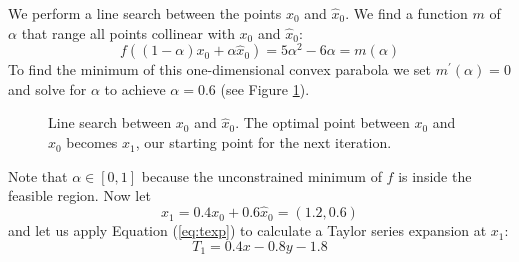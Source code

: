 We perform a line search between the points $x_0$ and $\hat{x}_0$.
We find a function $m$ of $\alpha$ that range all points collinear with $x_0$
and $\hat{x}_0$:
\[
f((1-\alpha) x_0 + \alpha \hat{x}_0) = 5\alpha^2 - 6\alpha = m(\alpha)
\]
To find the minimum of this one-dimensional convex parabola we set
$m^\prime(\alpha) = 0$ and solve for $\alpha$ to achieve $\alpha = 0.6$
(see Figure \ref{fig:steplength}).
\begin{figure}[h!]
    \centering
    
    \caption{Line search between $x_0$ and $\hat{x}_0$. The optimal point
             between $x_0$ and $\hat{x}_0$ becomes $x_1$, our starting point
             for the next iteration.}
    \label{fig:steplength}
\end{figure}

Note that $\alpha \in [0, 1]$ because the unconstrained minimum of $f$ is
inside the feasible region.
Now let
\[
x_1 = 0.4x_0 + 0.6\hat{x}_0 = (1.2, 0.6)
\]
and let us apply Equation (\ref{eq:texp}) to calculate a Taylor series
expansion at $x_1$:
\[
    T_1 = 0.4x - 0.8y - 1.8
\]
